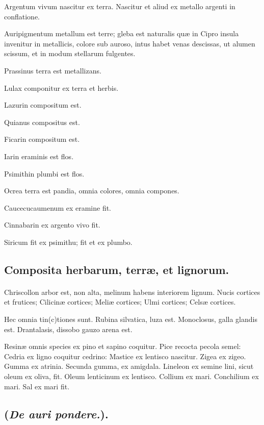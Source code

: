 \documentclass[a4paper, 11pt, oneside, polutonikogreek, italian]{article}
\begin{document}
Argentum vivum nascitur ex terra. Nascitur et aliud ex metallo argenti in conflatione.

Auripigmentum metallum est terre; gleba est naturalis quæ in Cipro insula invenitur in metallicis, colore sub auroso, intus habet venas descissas, ut alumen scissum, et in modum stellarum fulgentes.

Prassinus terra est metallizans.

Lulax componitur ex terra et herbis.

Lazurin compositum est.

Quianus compositus est.

Ficarin compositum est.

Iarin eraminis est flos.

Psimithin plumbi est flos.

Ocrea terra est pandia, omnia colores, omnia compones.

Caucecucaumenum ex eramine fit.

Cinnabarin ex argento vivo fit.

Siricum fit ex psimithu; fit et ex plumbo.

\subsection{Composita herbarum, terræ, et lignorum.}
\paragraph{}
Chriscollon arbor est, non alta, melinum habens interiorem lignum. Nucis cortices et frutices; Cilicinæ cortices; Meliæ cortices; Ulmi cortices; Celsæ cortices.

Hec omnia tin(c)tiones sunt. Rubina silvatica, luza est. Monoclosus, galla glandis est. Drantalasis, dissobo gauzo arena est.

Resinæ omnis species ex pino et sapino coquitur. Pice recocta pecola semel: Cedria ex ligno coquitur cedrino: Mastice ex lentisco nascitur. Zigea ex zigeo. Gumma ex atrinia. Secunda gumma, ex amigdala. Lineleon ex semine lini, sicut oleum ex oliva, fit. Oleum lenticinum ex lentisco. Collium ex mari. Conchilium ex mari. Sal ex mari fit.

\subsection{(\emph{De auri pondere.}).}
\end{document}
